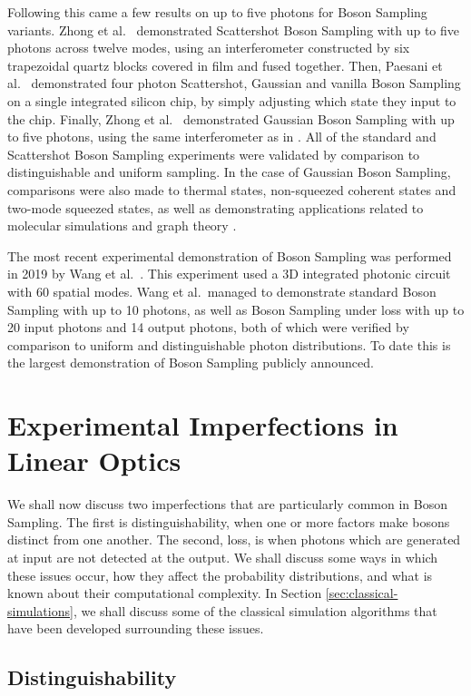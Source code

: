 Following this came a few results on up to five photons for Boson Sampling variants. Zhong et al.~\cite{zhong2018} demonstrated Scattershot Boson Sampling with up to five photons across twelve modes, using an interferometer constructed by six trapezoidal quartz blocks covered in film and fused together. Then, Paesani et al.~\cite{paesani2018} demonstrated four photon Scattershot, Gaussian and vanilla Boson Sampling on a single integrated silicon chip, by simply adjusting which state they input to the chip. Finally, Zhong et al.~\cite{zhong2019} demonstrated Gaussian Boson Sampling with up to five photons, using the same interferometer as in \cite{zhong2018}. All of the standard and Scattershot Boson Sampling experiments were validated by comparison to distinguishable and uniform sampling. In the case of Gaussian Boson Sampling, comparisons were also made to thermal states, non-squeezed coherent states and two-mode squeezed states, as well as demonstrating applications related to molecular simulations and graph theory \cite{paesani2018, zhong2019}.

The most recent experimental demonstration of Boson Sampling was performed in 2019 by Wang et al.~\cite{wang2019}. This experiment used a 3D integrated photonic circuit with 60 spatial modes. Wang et al.\ managed to demonstrate standard Boson Sampling with up to 10 photons, as well as Boson Sampling under loss with up to 20 input photons and 14 output photons, both of which were verified by comparison to uniform and distinguishable photon distributions. To date this is the largest demonstration of Boson Sampling publicly announced.

\section{Experimental Imperfections in Linear Optics}

We shall now discuss two imperfections that are particularly common in Boson Sampling. The first is distinguishability, when one or more factors make bosons distinct from one another. The second, loss, is when photons which are generated at input are not detected at the output. We shall discuss some ways in which these issues occur, how they affect the probability distributions, and what is known about their computational complexity. In Section \ref{sec:classical-simulations}, we shall discuss some of the classical simulation algorithms that have been developed surrounding these issues.

\subsection{Distinguishability}
\label{ssec:imperfections-distinguishability}

